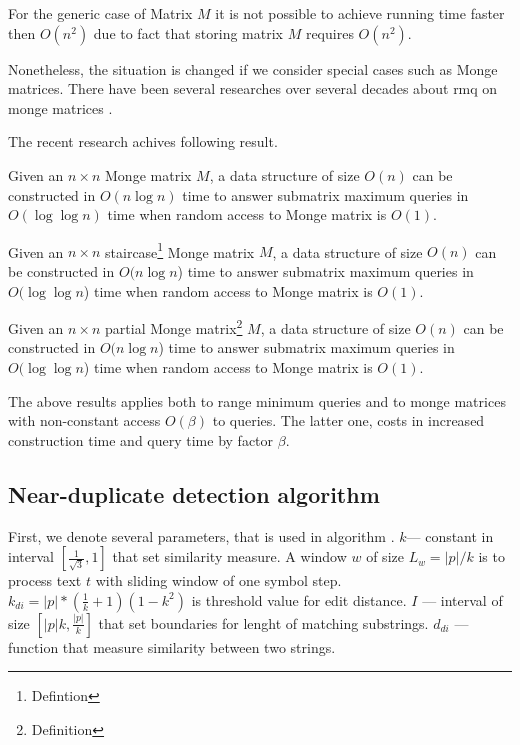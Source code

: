 For the generic case of Matrix $M$ it is not possible to
achieve running time faster then $O(n^2)$ due to fact that storing matrix $M$ requires $O(n^2)$.

Nonetheless, the situation is changed if we  consider special cases such as Monge matrices.
There have been several researches over several decades about 
rmq on monge matrices \cite{}.

The recent research achives following result\cite{}.

\begin{theorem}\cite{}
Given an $n \times n$ Monge matrix $M$, a data structure of size $O(n)$ can be constructed
in $O(n \log n)$ time to answer submatrix maximum queries in $O(\log \log n)$ time when random access to Monge matrix is $O(1)$.
\end{theorem}


\begin{theorem}\cite{}
Given an $n \times n$ staircase\footnote{Defintion} Monge matrix $M$, a data structure of size $O(n)$ can be
constructed in $O(n \log n$) time to answer submatrix maximum queries in $O(\log \log n$) time when random access to Monge matrix is $O(1)$.
\end{theorem}


\begin{theorem}\cite{}
Given an $n \times n$ partial Monge matrix\footnote{Definition} $M$, a data structure of size $O(n)$ can be
constructed in $O(n \log n$) time to answer submatrix maximum queries in $O(\log \log n$) time when random access to Monge matrix is $O(1)$.
\end{theorem}

The above results applies both to range  minimum queries and to monge matrices with non-constant access $O(\beta)$ to queries.
The latter one, costs in  increased construction time and query time by factor $\beta$. 

  





\subsection{Near-duplicate detection algorithm}
First, we denote several parameters, that is used in algorithm \cite{}.
$k$--- constant in interval $[\frac{1}{\sqrt{3}},1]$ that set similarity measure.  
A window $w$ of size $L_{w} = |p|/k$ is to process text $t$ with
sliding window of one symbol step.
$k_{di} = |p|*(\frac{1}{k}+1)(1-k^2)$ is threshold value for edit distance.
$I$ --- interval of size $[|p|k,\frac{|p|}{k}]$ that set boundaries for lenght of matching substrings.
$d_{di}$ --- function that measure similarity between two strings.

